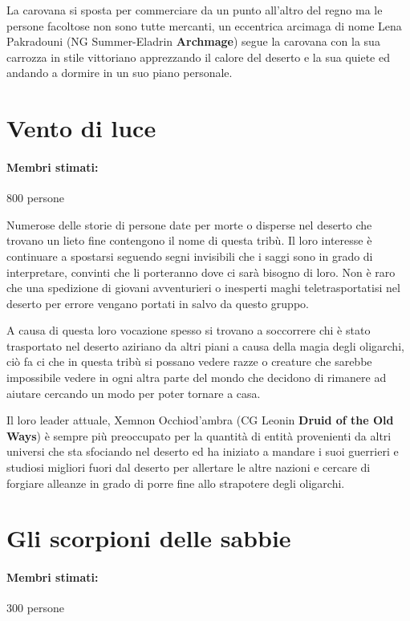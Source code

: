 \documentclass[letterpaper,twocolumn,openany,nodeprecatedcode]{dndbook}
\begin{document}
La carovana si sposta per commerciare da un punto all'altro del regno ma le persone facoltose non sono tutte mercanti, un eccentrica arcimaga di nome Lena Pakradouni (NG Summer-Eladrin \textbf{Archmage}) segue la carovana con la sua carrozza in stile vittoriano apprezzando il calore del deserto e la sua quiete ed andando a dormire in un suo piano personale.

\section{Vento di luce}
\paragraph{Membri stimati:} 800 persone

Numerose delle storie di persone date per morte o disperse nel deserto che trovano un lieto fine contengono il nome di questa tribù. Il loro interesse è continuare a spostarsi seguendo segni invisibili che i saggi sono in grado di interpretare, convinti che li porteranno dove ci sarà bisogno di loro. Non è raro che una spedizione di giovani avventurieri o inesperti maghi teletrasportatisi nel deserto per errore vengano portati in salvo da questo gruppo.

A causa di questa loro vocazione spesso si trovano a soccorrere chi è stato trasportato nel deserto aziriano da altri piani a causa della magia degli oligarchi, ciò fa ci che in questa tribù si possano vedere razze o creature che sarebbe impossibile vedere in ogni altra parte del mondo che decidono di rimanere ad aiutare cercando un modo per poter tornare a casa.

Il loro leader attuale, Xemnon Occhiod'ambra (CG Leonin \textbf{Druid of the Old Ways}) è sempre più preoccupato per la quantità di entità provenienti da altri universi che sta sfociando nel deserto ed ha iniziato a mandare i suoi guerrieri e studiosi migliori fuori dal deserto per allertare le altre nazioni e cercare di forgiare alleanze in grado di porre fine allo strapotere degli oligarchi.

\section{Gli scorpioni delle sabbie}
\paragraph{Membri stimati:} 300 persone
\end{document}
